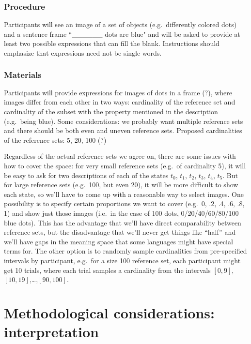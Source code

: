 \documentclass{article}
\begin{document}
\subsubsection{Procedure}

Participants will see an image of a set of objects (e.g.~differently colored dots) and a sentence frame ``\_\_\_\_\_\_ dots are blue" and will be asked to provide at least two possible expressions that can fill the blank. Instructions should emphasize that expressions need not be single words.

\subsubsection{Materials}

Participants will provide expressions for images of dots in a frame (?), where images differ from each other in two ways: cardinality of the reference set and cardinality of the subset with the property mentioned in the description (e.g.~being blue). Some considerations: we probably want multiple reference sets and there should be both even and uneven reference sets. Proposed cardinalities of the reference sets: 5, 20, 100 (?)

Regardless of the actual reference sets we agree on, there are some issues with how to cover the space: for very small reference sets (e.g.~of cardinality 5), it will be easy to ask for two descriptions of each of the states $t_0$, $t_1$, $t_2$, $t_3$, $t_4$, $t_5$. But for large reference sets (e.g.~100, but even 20), it will be more difficult to show each state, so we'll have to come up with a reasonable way to select images. One possibility is to specify certain proportions we want to cover (e.g.~0, .2, .4, .6, .8, 1) and show just those images (i.e.~in the case of 100 dots, 0/20/40/60/80/100 blue dots). This has the advantage that we'll have direct comparability between reference sets, but the disadvantage that we'll never get things like ``half'' and we'll have gaps in the meaning space that some languages might have special terms for. The other option is to randomly sample cardinalities from pre-specified intervals by participant, e.g.~for a size 100 reference set, each participant might get 10 trials, where each trial samples a cardinality from the intervals $[0,9]$, $[10,19]$,\dots,$[90,100]$.

\section{Methodological considerations: interpretation}	
\end{document}
